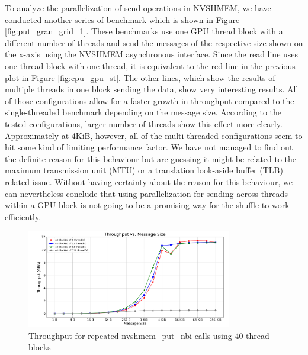 To analyze the parallelization of send operations in NVSHMEM, we have conducted another series of benchmark which is shown in Figure \ref{fig:put_gran_grid_1}.
These benchmarks use one GPU thread block with a different number of threads and send the messages of the respective size shown on the x-axis using the NVSHMEM asynchronous interface.
Since the read line uses one thread block with one thread, it is equivalent to the red line in the previous plot in Figure \ref{fig:cpu_gpu_st}.
The other lines, which show the results of multiple threads in one block sending the data, show very interesting results.
All of those configurations allow for a faster growth in throughput compared to the single-threaded benchmark depending on the message size.
According to the tested configurations, larger number of threads show this effect more clearly.
Approximately at 4KiB, however, all of the multi-threaded configurations seem to hit some kind of limiting performance factor.
We have not managed to find out the definite reason for this behaviour but are guessing it might be related to the maximum transmission unit (MTU) or a translation look-aside buffer (TLB) related issue.
Without having certainty about the reason for this behaviour, we can nevertheless conclude that using parallelization for sending across threads within a GPU block is not going to be a promising way for the shuffle to work efficiently.

\begin{figure}[h]
    \centering
    \includegraphics[width=0.8\textwidth]{img/put_granularity_grid40.png}
    \caption{Throughput for repeated nvshmem\_put\_nbi calls using 40 thread blocks}
    \label{fig:put_gran_grid_40}
\end{figure}

